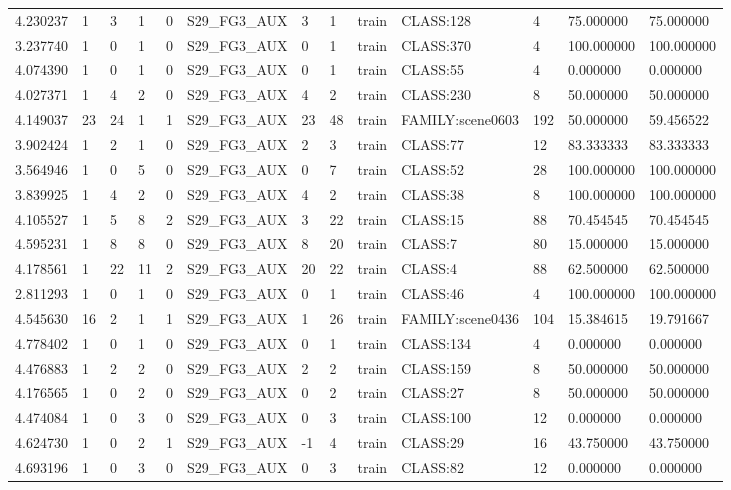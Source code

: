 \begin{tabular}{lllllllllllll}
4.230237 & 1 & 3 & 1 & 0 & S29\_FG3\_AUX & 3 & 1 & train & CLASS:128 & 4 & 75.000000 & 75.000000 \\
3.237740 & 1 & 0 & 1 & 0 & S29\_FG3\_AUX & 0 & 1 & train & CLASS:370 & 4 & 100.000000 & 100.000000 \\
4.074390 & 1 & 0 & 1 & 0 & S29\_FG3\_AUX & 0 & 1 & train & CLASS:55 & 4 & 0.000000 & 0.000000 \\
4.027371 & 1 & 4 & 2 & 0 & S29\_FG3\_AUX & 4 & 2 & train & CLASS:230 & 8 & 50.000000 & 50.000000 \\
4.149037 & 23 & 24 & 1 & 1 & S29\_FG3\_AUX & 23 & 48 & train & FAMILY:scene0603 & 192 & 50.000000 & 59.456522 \\
3.902424 & 1 & 2 & 1 & 0 & S29\_FG3\_AUX & 2 & 3 & train & CLASS:77 & 12 & 83.333333 & 83.333333 \\
3.564946 & 1 & 0 & 5 & 0 & S29\_FG3\_AUX & 0 & 7 & train & CLASS:52 & 28 & 100.000000 & 100.000000 \\
3.839925 & 1 & 4 & 2 & 0 & S29\_FG3\_AUX & 4 & 2 & train & CLASS:38 & 8 & 100.000000 & 100.000000 \\
4.105527 & 1 & 5 & 8 & 2 & S29\_FG3\_AUX & 3 & 22 & train & CLASS:15 & 88 & 70.454545 & 70.454545 \\
4.595231 & 1 & 8 & 8 & 0 & S29\_FG3\_AUX & 8 & 20 & train & CLASS:7 & 80 & 15.000000 & 15.000000 \\
4.178561 & 1 & 22 & 11 & 2 & S29\_FG3\_AUX & 20 & 22 & train & CLASS:4 & 88 & 62.500000 & 62.500000 \\
2.811293 & 1 & 0 & 1 & 0 & S29\_FG3\_AUX & 0 & 1 & train & CLASS:46 & 4 & 100.000000 & 100.000000 \\
4.545630 & 16 & 2 & 1 & 1 & S29\_FG3\_AUX & 1 & 26 & train & FAMILY:scene0436 & 104 & 15.384615 & 19.791667 \\
4.778402 & 1 & 0 & 1 & 0 & S29\_FG3\_AUX & 0 & 1 & train & CLASS:134 & 4 & 0.000000 & 0.000000 \\
4.476883 & 1 & 2 & 2 & 0 & S29\_FG3\_AUX & 2 & 2 & train & CLASS:159 & 8 & 50.000000 & 50.000000 \\
4.176565 & 1 & 0 & 2 & 0 & S29\_FG3\_AUX & 0 & 2 & train & CLASS:27 & 8 & 50.000000 & 50.000000 \\
4.474084 & 1 & 0 & 3 & 0 & S29\_FG3\_AUX & 0 & 3 & train & CLASS:100 & 12 & 0.000000 & 0.000000 \\
4.624730 & 1 & 0 & 2 & 1 & S29\_FG3\_AUX & -1 & 4 & train & CLASS:29 & 16 & 43.750000 & 43.750000 \\
4.693196 & 1 & 0 & 3 & 0 & S29\_FG3\_AUX & 0 & 3 & train & CLASS:82 & 12 & 0.000000 & 0.000000 \\

\end{tabular}
